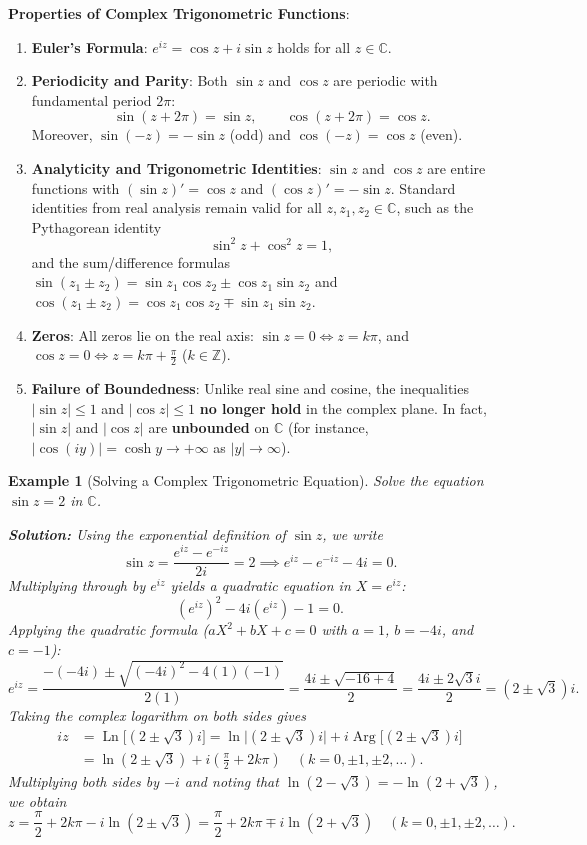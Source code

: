 \documentclass[11pt,a4paper]{article}
\theoremstyle{definitionbreak}
\theoremstyle{examplebreak}
\newtheorem{example}{Example}
\theoremstyle{plain}
\begin{document}
\textbf{Properties of Complex Trigonometric Functions}:
\begin{enumerate}
    \item \textbf{Euler's Formula}: $e^{iz} = \cos z + i\sin z$ holds for all $z \in \mathbb{C}$.
    \item \textbf{Periodicity and Parity}: Both $\sin z$ and $\cos z$ are periodic with fundamental period $2\pi$:
    \[
        \sin(z + 2\pi) = \sin z, \qquad \cos(z + 2\pi) = \cos z.
    \]
    Moreover, $\sin(-z) = -\sin z$ (odd) and $\cos(-z) = \cos z$ (even).
    \item \textbf{Analyticity and Trigonometric Identities}: $\sin z$ and $\cos z$ are entire functions with $(\sin z)' = \cos z$ and $(\cos z)' = -\sin z$. Standard identities from real analysis remain valid for all $z, z_1, z_2 \in \mathbb{C}$, such as the Pythagorean identity
    \[
        \sin^2 z + \cos^2 z = 1,
    \]
    and the sum/difference formulas $\sin(z_1 \pm z_2) = \sin z_1 \cos z_2 \pm \cos z_1 \sin z_2$ and $\cos(z_1 \pm z_2) = \cos z_1 \cos z_2 \mp \sin z_1 \sin z_2$.
    \item \textbf{Zeros}: All zeros lie on the real axis: $\sin z = 0 \iff z = k\pi$, and $\cos z = 0 \iff z = k\pi + \frac{\pi}{2}$ ($k \in \mathbb{Z}$).
    \item \textbf{Failure of Boundedness}: Unlike real sine and cosine, the inequalities $|\sin z| \le 1$ and $|\cos z| \le 1$ \textbf{no longer hold} in the complex plane. In fact, $|\sin z|$ and $|\cos z|$ are \textbf{unbounded} on $\mathbb{C}$ (for instance, $|\cos(iy)| = \cosh y \to +\infty$ as $|y| \to \infty$).
\end{enumerate}

\begin{example}[Solving a Complex Trigonometric Equation]
Solve the equation $\sin z = 2$ in $\mathbb{C}$.

\textbf{Solution:} Using the exponential definition of $\sin z$, we write
\[
    \sin z = \frac{e^{iz} - e^{-iz}}{2i} = 2 \implies e^{iz} - e^{-iz} - 4i = 0.
\]
Multiplying through by $e^{iz}$ yields a quadratic equation in $X = e^{iz}$:
\[
    (e^{iz})^2 - 4i(e^{iz}) - 1 = 0.
\]
Applying the quadratic formula ($aX^2 + bX + c = 0$ with $a = 1$, $b = -4i$, and $c = -1$):
\[
    e^{iz} = \frac{-(-4i) \pm \sqrt{(-4i)^2 - 4(1)(-1)}}{2(1)} = \frac{4i \pm \sqrt{-16 + 4}}{2} = \frac{4i \pm 2\sqrt{3}i}{2} = (2 \pm \sqrt{3})i.
\]
Taking the complex logarithm on both sides gives
\begin{align*}
    iz &= \operatorname{Ln}\bigl[(2 \pm \sqrt{3})i\bigr] = \ln\bigl|(2 \pm \sqrt{3})i\bigr| + i\operatorname{Arg}\bigl[(2 \pm \sqrt{3})i\bigr] \\
       &= \ln(2 \pm \sqrt{3}) + i\left(\frac{\pi}{2} + 2k\pi\right) \quad (k = 0, \pm 1, \pm 2, \dots).
\end{align*}
Multiplying both sides by $-i$ and noting that $\ln(2 - \sqrt{3}) = -\ln(2 + \sqrt{3})$, we obtain
\[
    z = \frac{\pi}{2} + 2k\pi - i\ln(2 \pm \sqrt{3}) = \frac{\pi}{2} + 2k\pi \mp i\ln(2 + \sqrt{3}) \quad (k = 0, \pm 1, \pm 2, \dots).
\]
\end{example}
\end{document}
